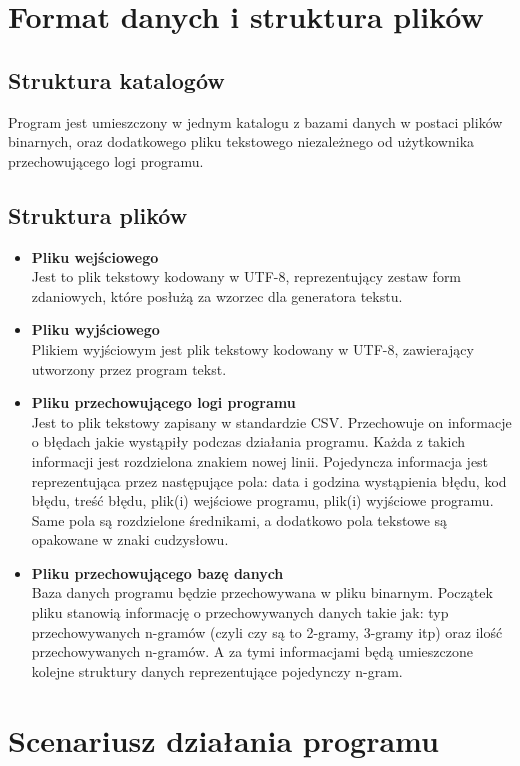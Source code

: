 \documentclass[a4paper,11pt]{article}
\begin{document}
\section{Format danych i struktura plików}
	\subsection{Struktura katalogów} 
	
	Program jest umieszczony w jednym katalogu z bazami danych w postaci plików binarnych, oraz dodatkowego pliku tekstowego niezależnego od użytkownika przechowującego logi programu.
	
	\subsection{Struktura plików}
	\begin{itemize}
	\item \textbf{ Pliku wejściowego} \\
		Jest to plik tekstowy kodowany w UTF-8, reprezentujący zestaw form zdaniowych, które posłużą za wzorzec dla generatora tekstu.
	\item \textbf{ Pliku wyjściowego} \\
		Plikiem wyjściowym jest plik tekstowy kodowany w UTF-8, zawierający utworzony przez program tekst.
	\item \textbf{ Pliku przechowującego logi programu} \\
		Jest to plik tekstowy zapisany w standardzie CSV. Przechowuje on informacje o błędach jakie wystąpiły podczas działania programu. Każda z takich informacji jest rozdzielona znakiem nowej linii. Pojedyncza informacja jest reprezentująca przez następujące pola: data i godzina wystąpienia błędu, kod błędu, treść błędu, plik(i) wejściowe programu, plik(i) wyjściowe programu. Same pola są rozdzielone średnikami,  a dodatkowo pola tekstowe są opakowane w znaki cudzysłowu.
	\item \textbf{ Pliku przechowującego bazę danych} \\
		Baza danych programu będzie przechowywana w pliku binarnym. Początek pliku stanowią informację o przechowywanych danych takie jak: typ przechowywanych n-gramów (czyli czy są to 2-gramy, 3-gramy itp) oraz ilość przechowywanych n-gramów. A za tymi informacjami będą umieszczone kolejne struktury danych reprezentujące pojedynczy n-gram.
		\end{itemize}

	
\section{Scenariusz działania programu}
\end{document}
